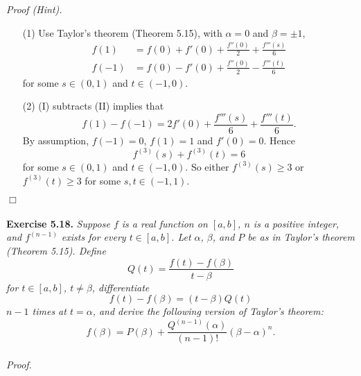 \documentclass{article}
\begin{document}
\emph{Proof (Hint).}
\begin{enumerate}
\item[(1)]
Use Taylor's theorem (Theorem 5.15), with $\alpha = 0$ and $\beta=\pm 1$,
\begin{align*}
  f(1) &= f(0) + f'(0) + \frac{f''(0)}{2} + \frac{f'''(s)}{6} \tag{I} \\
  f(-1) &= f(0) - f'(0) + \frac{f''(0)}{2} - \frac{f'''(t)}{6} \tag{II}
\end{align*}
for some $s \in (0,1)$ and $t \in (-1,0)$.

\item[(2)]
(I) subtracts (II) implies that
\[
  f(1) - f(-1) = 2 f'(0) + \frac{f'''(s)}{6} + \frac{f'''(t)}{6}.
\]
By assumption, $f(-1)=0$, $f(1)=1$ and $f'(0)=0$.
Hence
\[
  f^{(3)}(s) + f^{(3)}(t) = 6
\]
for some $s \in (0,1)$ and $t \in (-1,0)$.
So either $f^{(3)}(s) \geq 3$ or $f^{(3)}(t) \geq 3$
for some $s, t \in (-1,1)$.
\end{enumerate}
$\Box$ \\\\






\textbf{Exercise 5.18.}
\emph{Suppose $f$ is a real function on $[a,b]$, $n$ is a positive integer,
and $f^{(n-1)}$ exists for every $t \in [a,b]$.
Let $\alpha$, $\beta$, and $P$ be as in Taylor's theorem (Theorem 5.15).
Define
\[
  Q(t) = \frac{f(t) - f(\beta)}{t - \beta}
\]
for $t \in [a,b]$, $t \neq \beta$, differentiate
\[
  f(t) - f(\beta) = (t - \beta)Q(t)
\]
$n-1$ times at $t = \alpha$,
and derive the following version of Taylor's theorem:
\[
  f(\beta) = P(\beta)
    + \frac{Q^{(n-1)}(\alpha)}{(n-1)!} (\beta - \alpha)^n.
\]} \\

\emph{Proof.}



\end{document}
